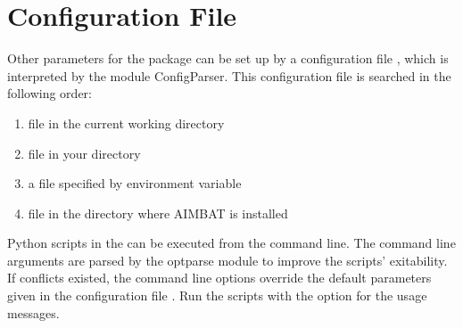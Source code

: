 \documentclass[letterpaper,10pt,english]{sphinxmanual}
\begin{document}
\section{Configuration File}
\label{docfiles/parameterConfiguration:configuration-file}
Other parameters for the package can be set up by a configuration file , which is interpreted by the module ConfigParser. This configuration file is searched in the following order:
\begin{enumerate}
\item {} 
file  in the current working directory

\item {} 
file  in your  directory

\item {} 
a file specified by environment variable 

\item {} 
file  in the directory where AIMBAT is installed

\end{enumerate}

Python scripts in the  can be executed from the command line. The command line arguments are parsed by the optparse module to improve the scripts' exitability. If conflicts existed, the command line options override the default parameters given in the configuration file . Run the scripts with the  option for the usage messages.
\end{document}
